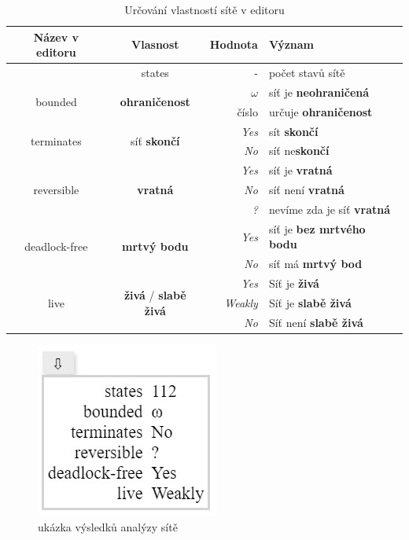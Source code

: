 \documentclass[
  biblatex,
  glossaries,
  index
]{kidiplom}
\begin{document}
\begin{table}[h]
  \centering
  \begin{tabular}{| c | c | r l |}
  \hline
    Název v editoru & Vlasnost & Hodnota & Význam \\
    \hline
    \hline
    & states & - & počet stavů sítě \\ 
    \hline
    \multirow{2}{*}{bounded} & \multirow{2}{*}{\textbf{ohraničenost}} & \textit{$\omega$} &  síť je \textbf{neohraničená} \\ 
    &                   & číslo & určuje \textbf{ohraničenost} \\ 
    \hline
\multirow{2}{*}{terminates} & \multirow{2}{*}{síť \textbf{skončí}} & \textit{Yes} & sít \textbf{skončí} \\ 
    &                   & \textit{No} & síť ne\textbf{skončí} \\ 
    \hline
\multirow{3}{*}{reversible} & \multirow{3}{*}{\textbf{vratná}} & \textit{Yes} & síť je \textbf{vratná} \\ 
    &                   &   \textit{No} & síť není \textbf{vratná}  \\
    &                   & \textit{?} & nevíme zda je síť \textbf{vratná} \\ 
    \hline
\multirow{2}{*}{deadlock-free} & \multirow{2}{*}{\textbf{mrtvý bodu}} & \textit{Yes} & síť je \textbf{bez mrtvého bodu} \\ 
    &                   &  \textit{No} & síť má \textbf{mrtvý bod}  \\ 
    \hline
\multirow{3}{*}{live} & \multirow{3}{*}{\textbf{živá} / \textbf{slabě živá}} 
                         & \textit{Yes} & Síť je \textbf{živá} \\ 
    &                   & \textit{Weakly}  & Síť je \textbf{slabě živá} \\ 
    &                   & \textit{No} & Síť není \textbf{slabě živá} \\ 
    \hline

  \end{tabular}
  \caption{Určování vlastností sítě v editoru} \label{}  
\end{table}

\begin{figure}[h]
  \centering
  \includegraphics{analysis}
  \caption{ukázka výsledků analýzy sítě}\label{analýza obrázek}
\end{figure}
\end{document}
